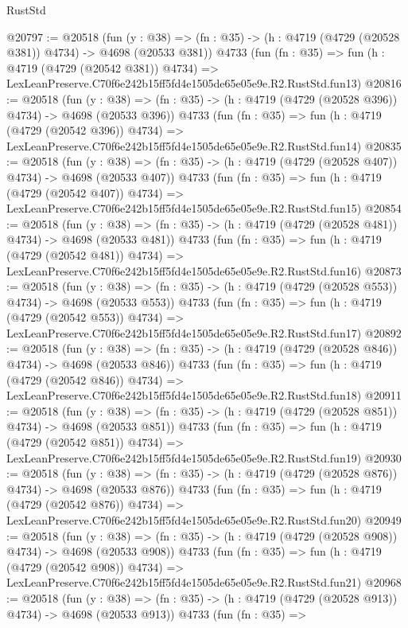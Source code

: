 \begin{lexlean}{RustStd}
\begin{coremodule}
@20797 := @20518
    (fun (y : @38) => (fn : @35) -> (h : @4719 (@4729 (@20528 @381)) @4734) -> @4698 (@20533 @381))
    @4733
    (fun (fn : @35) =>
    fun (h : @4719 (@4729 (@20542 @381)) @4734) =>
    LexLeanPreserve.C70f6e242b15ff5fd4e1505de65e05e9e.R2.RustStd.fun13)
@20816 := @20518
    (fun (y : @38) => (fn : @35) -> (h : @4719 (@4729 (@20528 @396)) @4734) -> @4698 (@20533 @396))
    @4733
    (fun (fn : @35) =>
    fun (h : @4719 (@4729 (@20542 @396)) @4734) =>
    LexLeanPreserve.C70f6e242b15ff5fd4e1505de65e05e9e.R2.RustStd.fun14)
@20835 := @20518
    (fun (y : @38) => (fn : @35) -> (h : @4719 (@4729 (@20528 @407)) @4734) -> @4698 (@20533 @407))
    @4733
    (fun (fn : @35) =>
    fun (h : @4719 (@4729 (@20542 @407)) @4734) =>
    LexLeanPreserve.C70f6e242b15ff5fd4e1505de65e05e9e.R2.RustStd.fun15)
@20854 := @20518
    (fun (y : @38) => (fn : @35) -> (h : @4719 (@4729 (@20528 @481)) @4734) -> @4698 (@20533 @481))
    @4733
    (fun (fn : @35) =>
    fun (h : @4719 (@4729 (@20542 @481)) @4734) =>
    LexLeanPreserve.C70f6e242b15ff5fd4e1505de65e05e9e.R2.RustStd.fun16)
@20873 := @20518
    (fun (y : @38) => (fn : @35) -> (h : @4719 (@4729 (@20528 @553)) @4734) -> @4698 (@20533 @553))
    @4733
    (fun (fn : @35) =>
    fun (h : @4719 (@4729 (@20542 @553)) @4734) =>
    LexLeanPreserve.C70f6e242b15ff5fd4e1505de65e05e9e.R2.RustStd.fun17)
@20892 := @20518
    (fun (y : @38) => (fn : @35) -> (h : @4719 (@4729 (@20528 @846)) @4734) -> @4698 (@20533 @846))
    @4733
    (fun (fn : @35) =>
    fun (h : @4719 (@4729 (@20542 @846)) @4734) =>
    LexLeanPreserve.C70f6e242b15ff5fd4e1505de65e05e9e.R2.RustStd.fun18)
@20911 := @20518
    (fun (y : @38) => (fn : @35) -> (h : @4719 (@4729 (@20528 @851)) @4734) -> @4698 (@20533 @851))
    @4733
    (fun (fn : @35) =>
    fun (h : @4719 (@4729 (@20542 @851)) @4734) =>
    LexLeanPreserve.C70f6e242b15ff5fd4e1505de65e05e9e.R2.RustStd.fun19)
@20930 := @20518
    (fun (y : @38) => (fn : @35) -> (h : @4719 (@4729 (@20528 @876)) @4734) -> @4698 (@20533 @876))
    @4733
    (fun (fn : @35) =>
    fun (h : @4719 (@4729 (@20542 @876)) @4734) =>
    LexLeanPreserve.C70f6e242b15ff5fd4e1505de65e05e9e.R2.RustStd.fun20)
@20949 := @20518
    (fun (y : @38) => (fn : @35) -> (h : @4719 (@4729 (@20528 @908)) @4734) -> @4698 (@20533 @908))
    @4733
    (fun (fn : @35) =>
    fun (h : @4719 (@4729 (@20542 @908)) @4734) =>
    LexLeanPreserve.C70f6e242b15ff5fd4e1505de65e05e9e.R2.RustStd.fun21)
@20968 := @20518
    (fun (y : @38) => (fn : @35) -> (h : @4719 (@4729 (@20528 @913)) @4734) -> @4698 (@20533 @913))
    @4733
    (fun (fn : @35) =>

\end{coremodule}
\end{lexlean}
